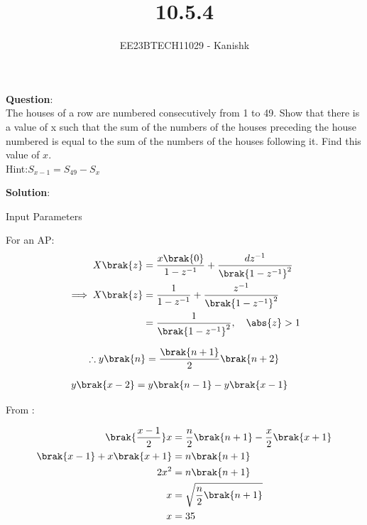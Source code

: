 \documentclass[journal,12pt,onecolumn]{IEEEtran}
\theoremstyle{remark}
\begin{document}

\vspace{3cm}

\title{10.5.4}
\author{EE23BTECH11029 - Kanishk}
\maketitle

\bigskip

\renewcommand{\thefigure}{\theenumi}
\renewcommand{\thetable}{\theenumi}
\textbf{Question}:\\
The houses of a row are numbered consecutively from 1 to 49. Show that there is a value
of x such that the sum of the numbers of the houses preceding the house numbered is equal to the sum of the numbers of the houses following it. Find this value of $x$.\\
Hint:$ S_{x-1}=S_{49}-S_x$

\textbf{Solution}:\\
\fi
\begin{table}[ht]
    \centering
    \def\arraystretch{2.5}
    
   \caption{Input Parameters}
   \label{tab:10.5.4}
\end{table}

For an AP: 
\begin{align}
X\brak{z}&=\frac{x\brak{0}}{1-z^{-1}}+ \frac{dz^{-1}}{\brak{1-z^{-1}}^{2}}\\
\implies X\brak{z}&=\frac{1}{1-z^{-1}}+ \frac{z^{-1}}{\brak{1-z^{-1}}^{2}}\\
&=\frac{1}{\brak{1-z^{-1}}^{2}},\quad \abs{z} > 1
\end{align}

\begin{align}
    \therefore y\brak{n}=\frac{\brak{n+1}}{2}\brak{n+2}
\end{align}

\begin{align}
y\brak{x-2}&=y\brak{n-1}-y\brak{x-1}
\end{align}

\newpage
From :

\begin{align}
\brak{\frac{x-1}{2}}x&=\frac{n}{2}\brak{n+1}-\frac{x}{2}\brak{x+1}\\
\brak{x-1}+x\brak{x+1}&=n\brak{n+1}\\
2x^{2}&=n\brak{n+1}\\
x&=\sqrt{\frac{n}{2}\brak{n+1}}\\
x&=35
\end{align}
\end{document}
